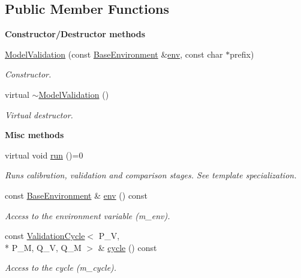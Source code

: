 \subsection*{Public Member Functions}
\begin{Indent}{\bf Constructor/\-Destructor methods}\par
\begin{DoxyCompactItemize}
\item 
\hyperlink{class_q_u_e_s_o_1_1_model_validation_a4745b3be6aaaeab5c904b2b4fe9f25f8}{Model\-Validation} (const \hyperlink{class_q_u_e_s_o_1_1_base_environment}{Base\-Environment} \&\hyperlink{class_q_u_e_s_o_1_1_model_validation_a8da12a6dfe30feba5e3319031049a93f}{env}, const char $\ast$prefix)
\begin{DoxyCompactList}\small\item\em Constructor. \end{DoxyCompactList}\item 
virtual \hyperlink{class_q_u_e_s_o_1_1_model_validation_aa840badb782acf1a02e0c46c84bcdfe4}{$\sim$\-Model\-Validation} ()
\begin{DoxyCompactList}\small\item\em Virtual destructor. \end{DoxyCompactList}\end{DoxyCompactItemize}
\end{Indent}
\begin{Indent}{\bf Misc methods}\par
\begin{DoxyCompactItemize}
\item 
virtual void \hyperlink{class_q_u_e_s_o_1_1_model_validation_a1b8ef95ed1755f393e70b765ac009552}{run} ()=0
\begin{DoxyCompactList}\small\item\em Runs calibration, validation and comparison stages. See template specialization. \end{DoxyCompactList}\item 
const \hyperlink{class_q_u_e_s_o_1_1_base_environment}{Base\-Environment} \& \hyperlink{class_q_u_e_s_o_1_1_model_validation_a8da12a6dfe30feba5e3319031049a93f}{env} () const 
\begin{DoxyCompactList}\small\item\em Access to the environment variable (m\-\_\-env). \end{DoxyCompactList}\item 
const \hyperlink{class_q_u_e_s_o_1_1_validation_cycle}{Validation\-Cycle}$<$ P\-\_\-\-V, \\*
P\-\_\-\-M, Q\-\_\-\-V, Q\-\_\-\-M $>$ \& \hyperlink{class_q_u_e_s_o_1_1_model_validation_a3ea30ea21d361878e5aea12f6aff8e0f}{cycle} () const 
\begin{DoxyCompactList}\small\item\em Access to the cycle (m\-\_\-cycle). \end{DoxyCompactList}\end{DoxyCompactItemize}
\end{Indent}
